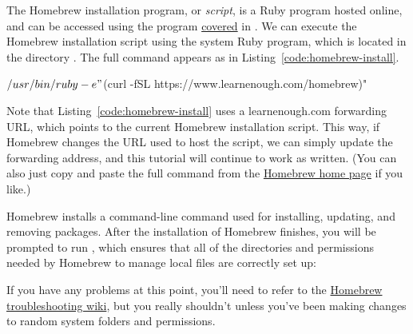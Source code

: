 The Homebrew installation program, or \emph{script}, is a Ruby program hosted online, and can be accessed using the  program \href{https://www.learnenough.com/command-line-tutorial#sec-downloading_a_file}{covered} in \lecl. We can execute the Homebrew installation script using the system Ruby program, which is located in the directory . The full command appears as in Listing~\ref{code:homebrew-install}.


\begin{codelisting}
\label{code:homebrew-install}
\begin{code}
$ /usr/bin/ruby -e "$(curl -fSL https://www.learnenough.com/homebrew)"
\end{code}
\end{codelisting}

Note that Listing~\ref{code:homebrew-install} uses a learnenough.com forwarding URL, which points to the current Homebrew installation script. This way, if Homebrew changes the URL used to host the script, we can simply update the forwarding address, and this tutorial will continue to work as written. (You can also just copy and paste the full command from the \href{http://brew.sh/}{Homebrew home page} if you like.)

Homebrew installs a  command-line command used for installing, updating, and removing packages. After the installation of Homebrew finishes, you will be prompted to run , which ensures that all of the directories and permissions needed by Homebrew to manage local files are correctly set up:


\noindent If you have any problems at this point, you'll need to refer to the \href{https://github.com/Homebrew/homebrew/wiki/troubleshooting}{Homebrew troubleshooting wiki}, but you really shouldn't unless you've been making changes to random system folders and permissions.


